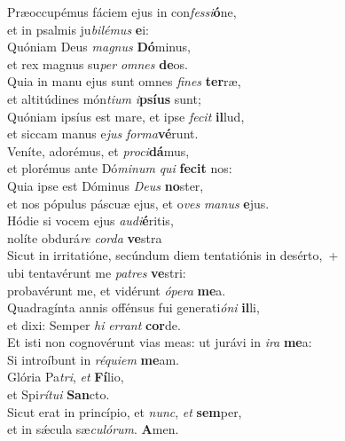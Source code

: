 \evenverse Præoccupémus fáciem ejus in con\textit{fes}\textit{si}\textbf{ó}ne,~\*\\
\evenverse et in psalmis ju\textit{bi}\textit{lé}\textit{mus} \textbf{e}i:\\
\oddverse Quóniam Deus \textit{ma}\textit{gnus} \textbf{Dó}minus,~\*\\
\oddverse et rex magnus su\textit{per} \textit{om}\textit{nes} \textbf{de}os.\\
\evenverse Quia in manu ejus sunt omnes \textit{fi}\textit{nes} \textbf{ter}ræ,~\*\\
\evenverse et altitúdines món\textit{ti}\textit{um} \textit{i}\textbf{psí}\textbf{us} sunt;\\
\oddverse Quóniam ipsíus est mare, et ipse \textit{fe}\textit{cit} \textbf{il}lud,~\*\\
\oddverse et siccam manus e\textit{jus} \textit{for}\textit{ma}\textbf{vé}runt.\\
\evenverse Veníte, adorémus, et \textit{pro}\textit{ci}\textbf{dá}mus,~\*\\
\evenverse et plorémus ante Dó\textit{mi}\textit{num} \textit{qui} \textbf{fe}\textbf{cit} nos:\\
\oddverse Quia ipse est Dóminus \textit{De}\textit{us} \textbf{no}ster,~\*\\
\oddverse et nos pópulus páscuæ ejus, et o\textit{ves} \textit{ma}\textit{nus} \textbf{e}jus.\\
\evenverse Hódie si vocem ejus \textit{au}\textit{di}\textbf{é}ritis,~\*\\
\evenverse nolíte obdurá\textit{re} \textit{cor}\textit{da} \textbf{ve}stra\\
\oddverse Sicut in irritatióne, secúndum diem tentatiónis in desérto,~+\\
\oddverse  ubi tentavérunt me \textit{pa}\textit{tres} \textbf{ve}stri:~\*\\
\oddverse probavérunt me, et vidérunt \textit{ó}\textit{pe}\textit{ra} \textbf{me}a.\\
\evenverse Quadragínta annis offénsus fui generati\textit{ó}\textit{ni} \textbf{il}li,~\*\\
\evenverse et dixi: Semper \textit{hi} \textit{er}\textit{rant} \textbf{cor}de.\\
\oddverse Et isti non cognovérunt vias meas: ut jurávi in \textit{i}\textit{ra} \textbf{me}a:~\*\\
\oddverse Si introíbunt in \textit{ré}\textit{qui}\textit{em} \textbf{me}am.\\
\evenverse Glória Pa\textit{tri}, \textit{et} \textbf{Fí}lio,~\*\\
\evenverse et Spi\textit{rí}\textit{tu}\textit{i} \textbf{San}cto.\\
\oddverse Sicut erat in princípio, et \textit{nunc}, \textit{et} \textbf{sem}per,~\*\\
\oddverse et in sǽcula sæ\textit{cu}\textit{ló}\textit{rum}. \textbf{A}men.\\
